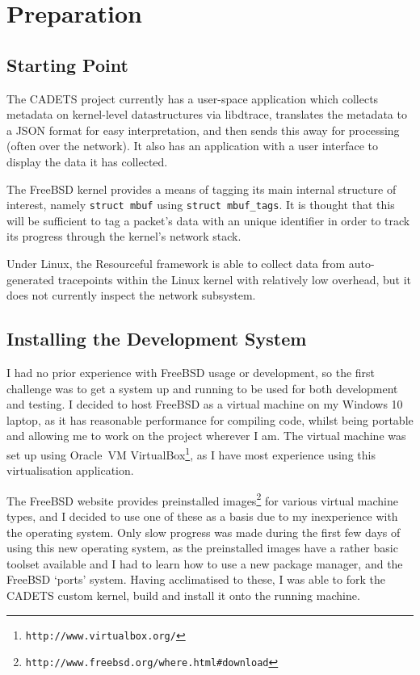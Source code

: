 \documentclass[a4paper,12pt,twoside,openright]{report}
\begin{document}
	
	\chapter{Preparation}
	
	\section{Starting Point}
	
	The CADETS project currently has a user-space application which collects metadata on kernel-level	datastructures via libdtrace, translates the metadata to a JSON format for easy interpretation, and	then sends this away for processing (often over the network). It also has an application with a user interface to display the data it has collected.
	
	The FreeBSD kernel provides a means of tagging its main internal structure of interest, namely \verb|struct mbuf| using \verb|struct mbuf_tags|. It is thought that this will be sufficient to tag a packet’s data with an unique identifier in order to track its progress through the kernel’s network stack.
	
	Under Linux, the Resourceful framework is able to collect data from auto-generated tracepoints	within the Linux kernel with relatively low overhead, but it does not currently inspect the network subsystem.
	
	\section{Installing the Development System}
	
	I had no prior experience with FreeBSD usage or development, so the first challenge was to get a system up and running to be used for both development and testing. I decided to host FreeBSD as a virtual machine on my Windows 10 laptop, as it has reasonable performance for compiling code, whilst being portable and allowing me to work on the project wherever I am. The virtual machine was set up using Oracle\texttrademark\ VM VirtualBox\footnote{\texttt{http://www.virtualbox.org/}}, as I have most experience using this virtualisation application.
	
	The FreeBSD website provides preinstalled images\footnote{\texttt{http://www.freebsd.org/where.html\#download}} for various virtual machine types, and I decided to use one of these as a basis due to my inexperience with the operating system. Only slow progress was made during the first few days of using this new operating system, as the preinstalled images have a rather basic toolset available and I had to learn how to use a new package manager, and the FreeBSD `ports' system. Having acclimatised to these, I was able to fork the CADETS custom kernel, build and install it onto the running machine.
	
\end{document}
